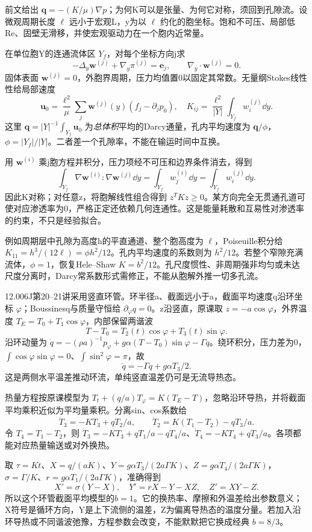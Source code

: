 前文给出 $\mathbf q=-(K/\mu)\nabla p$；为何K可以是张量、为何它对称，须回到孔隙流。设微观周期长度 $\ell$ 远小于宏观L，y为以 $\ell$ 约化的胞坐标。饱和不可压、局部低Re、固壁无滑移，并使宏观驱动力在一个胞内近常量。

在单位胞Y的连通流体区 $Y_f$，对每个坐标方向j求
\[
 -\Delta_y\mathbf w^{(j)}+\nabla_y\pi^{(j)}=\mathbf e_j,
 \qquad\nabla_y\cdot\mathbf w^{(j)}=0.
\]
固体表面 $\mathbf w^{(j)}=0$，外胞界周期，压力均值置0以固定其常数。无量纲Stokes线性性给局部速度
\[
 \mathbf u_0=\frac{\ell^2}{\mu}\sum_j\mathbf w^{(j)}(y)
                 (f_j-\partial_jp_0),\quad
 K_{ij}=\frac{\ell^2}{|Y|}\int_{Y_f}w_i^{(j)}\dd y.
\]
这里 $\mathbf q=|Y|^{-1}\int_{Y_f}\mathbf u_0$ 为\emph{总体积}平均的Darcy通量，孔内平均速度为 $\mathbf q/\phi$，$\phi=|Y_f|/|Y|$。二者差一个孔隙率，不能在输运时间中互换。

用 $\mathbf w^{(i)}$ 乘j胞方程并积分，压力项经不可压和边界条件消去，得到
\[
 \int_{Y_f}\nabla\mathbf w^{(i)}:\nabla\mathbf w^{(j)}\dd y
 =\int_{Y_f}w_j^{(i)}\dd y
 =\int_{Y_f}w_i^{(j)}\dd y.
\]
因此K对称；对任意z，将胞解线性组合得到 $z^TKz\ge0$。某方向完全无贯通孔道可使对应渗透率为0，严格正定还依赖几何连通性。这是能量耗散和互易性对渗透率的约束，不只是经验拟合。

例如周期层中孔隙为高度h的平直通道、整个胞高度为 $\ell$，Poiseuille积分给 $K_{11}=h^3/(12\ell)=\phi h^2/12$。孔内平均速度的系数则为 $h^2/12$。若整个窄隙充满流体，$\phi=1$，恢复Hele--Shaw $K=b^2/12$。孔尺度惯性、非周期强非均匀或未达尺度分离时，Darcy常系数形式需修正，不能从胞解外推一切多孔流。

12.006J第20--21讲采用竖直环管。环半径a、截面远小于a，截面平均速度q沿环坐标 $\varphi$；Boussinesq与质量守恒给 $\partial_\varphi q=0$。z沿竖直，原课取 $z=-a\cos\varphi$，外界温度 $T_E=T_0+T_1\cos\varphi$，内部保留两谐波
\[
 T-T_0=T_2(t)\cos\varphi+T_3(t)\sin\varphi.
\]
沿环动量为 $\dot q=-(\rho a)^{-1}p_\varphi+g\alpha(T-T_0)\sin\varphi-\Gamma q$。绕环积分，压力差为0，$\int\cos\varphi\sin\varphi=0$、$\int\sin^2\varphi=\pi$，故
\[
 \dot q=-\Gamma q+g\alpha T_3/2.
\]
这是两侧水平温差推动环流，单纯竖直温差仍可是无流导热态。

热量方程按原课模型为 $T_t+(q/a)T_\varphi=K(T_E-T)$，忽略沿环导热，并将截面平均乘积近似为平均量乘积。分离sin、cos系数给
\[
 \dot T_3=-KT_3+qT_2/a,\qquad
 \dot T_2=K(T_1-T_2)-qT_3/a.
\]
令 $T_4=T_1-T_2$，则 $\dot T_3=-KT_3+qT_1/a-qT_4/a$、$\dot T_4=-KT_4+qT_3/a$。各项都能对应热量输送或对外换热。

取 $\tau=Kt$、$X=q/(aK)$、$Y=g\alpha T_3/(2a\Gamma K)$、$Z=g\alpha T_4/(2a\Gamma K)$，$\sigma=\Gamma/K$、$r=g\alpha T_1/(2a\Gamma K)$，准确得到
\[
 X'=\sigma(Y-X),\quad Y'=rX-Y-XZ,\quad Z'=XY-Z.
\]
所以这个环管截面平均模型的\textbf{$b=1$}。它的换热率、摩擦和外温差给出参数意义；X符号是循环方向，Y是上下流侧的温差，Z为偏离导热态的温度分量。若加入沿环导热或不同谐波弛豫，方程参数会改变，不能默默把它换成经典 $b=8/3$。

